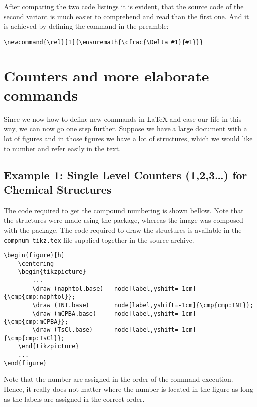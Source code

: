 \documentclass[
]{scrartcl}
\begin{document}
%
After comparing the two code listings it is evident, that the source code of the
    second variant is much easier to comprehend and read than the first one.
%
And it is achieved by defining the  command in the preamble:
%
\begin{lstlisting}
\newcommand{\rel}[1]{\ensuremath{\cfrac{\Delta #1}{#1}}}
\end{lstlisting}

\section{Counters and more elaborate commands}

%
Since we now how to define new commands in \LaTeX{} and ease our life in this
    way, we can now go one step further. 
%
Suppose we have a large document with a lot of figures and in those figures we
    have a lot of structures, which we would like to number and refer easily in
    the text. 

%
\subsection{Example 1: Single Level Counters (1,2,3\ldots) for Chemical
    Structures}

%

%
The code required to get the compound numbering is shown bellow.
%
Note that the structures were made using the  package, whereas the
    image was composed with the  package.
%
The code required to draw the structures is available in the
    \texttt{compnum-tikz.tex} file supplied together in the source archive.
%
\begin{lstlisting}
\begin{figure}[h]
    \centering
    \begin{tikzpicture}
        ...
        \draw (naphtol.base)   node[label,yshift=-1cm]{\cmp{cmp:naphtol}};
        \draw (TNT.base)       node[label,yshift=-1cm]{\cmp{cmp:TNT}};
        \draw (mCPBA.base)     node[label,yshift=-1cm]{\cmp{cmp:mCPBA}};
        \draw (TsCl.base)      node[label,yshift=-1cm]{\cmp{cmp:TsCl}};
    \end{tikzpicture}
    ...
\end{figure}
\end{lstlisting}
%
Note that the number are assigned in the order of the command execution.
    Hence, it really does not matter where the number is located in the figure
    as long as the labels are assigned in the correct order.
\end{document}
